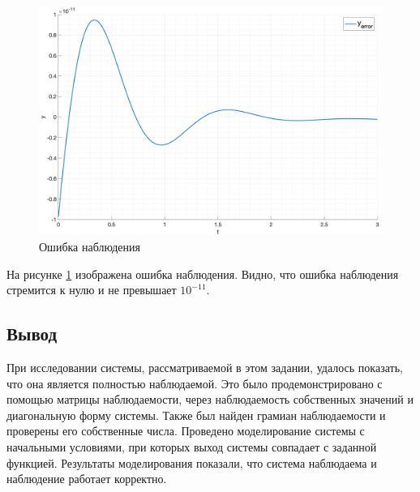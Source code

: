 \begin{figure}
    \centering
    \includegraphics[width=\textwidth]{media/plots/task3_error.png}
    \caption{Ошибка наблюдения}
    \label{fig:task3_estimation}
\end{figure}
На рисунке \ref{fig:task3_estimation} изображена ошибка наблюдения. Видно, что ошибка наблюдения стремится к нулю
и не превышает $10^{-11}$.

\subsection{Вывод}
При исследовании системы, рассматриваемой в этом задании, удалось показать,
что она является полностью наблюдаемой. Это было продемонстрировано с помощью
матрицы наблюдаемости, через наблюдаемость собственных значений и диагональную
форму системы. Также был найден грамиан наблюдаемости и проверены его собственные
числа. Проведено моделирование системы с начальными условиями, при которых выход
системы совпадает с заданной функцией. Результаты моделирования показали, что
система наблюдаема и наблюдение работает корректно.